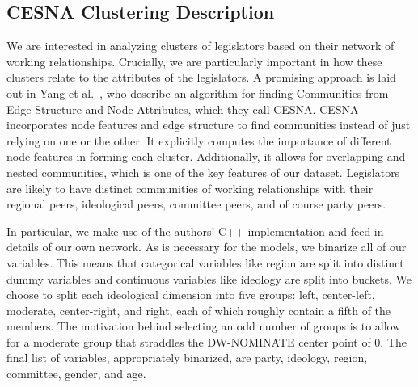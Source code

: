 \subsection{CESNA Clustering Description}

We are interested in analyzing clusters of legislators based on their network of
working relationships. Crucially, we are particularly important in how these
clusters relate to the attributes of the legislators. A promising approach is
laid out in Yang et al.~\cite{Yang}, who describe an algorithm for finding
Communities from Edge Structure and Node Attributes, which they call CESNA.
CESNA incorporates node features and edge structure to find communities instead
of just relying on one or the other. It explicitly computes the importance of
different node features in forming each cluster. Additionally, it allows for
overlapping and nested communities, which is one of the key features of our
dataset. Legislators are likely to have distinct communities of working
relationships with their regional peers, ideological peers, committee peers, and
of course party peers.

In particular, we make use of the authors' C++ implementation and feed in
details of our own network. As is necessary for the models, we binarize all of
our variables. This means that categorical variables like region are split into
distinct dummy variables and continuous variables like ideology are split into
buckets. We choose to split each ideological dimension into five groups: left,
center-left, moderate, center-right, and right, each of which roughly contain a
fifth of the members. The motivation behind selecting an odd number of groups is
to allow for a moderate group that straddles the DW-NOMINATE center point of 0.
The final list of variables, appropriately binarized, are party, ideology,
region, committee, gender, and age.
